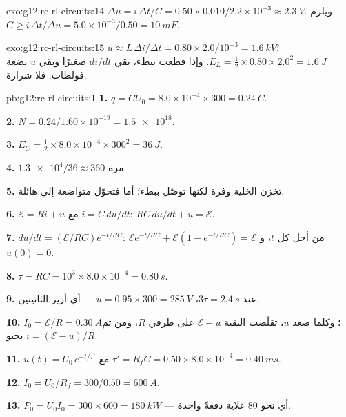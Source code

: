 \begin{solution}{exo:g12:rc-rl-circuits:14}
$\Delta u = i\,\Delta t/C = 0.50 \times 0.010/2.2\times10^{-3} \approx
\qty{2.3}{V}$. ويلزم $C \geq i\,\Delta t/\Delta u =
5.0\times10^{-3}/0.50 = \qty{10}{mF}$.
\end{solution}

\begin{solution}{exo:g12:rc-rl-circuits:15}
$u \approx L\,\Delta i/\Delta t = 0.80 \times 2.0/10^{-3} =
\qty{1.6}{kV}$؛ $E_L = \tfrac12 \times 0.80 \times 2.0^2 =
\qty{1.6}{J}$. وإذا قطعت ببطء، بقي $di/dt$ صغيرًا وبقي $u$ بضعة فولطات:
فلا شرارة.
\end{solution}

\begin{solution}{pb:g12:rc-rl-circuits:1}
\textbf{1.} $q = CU_0 = 8.0\times10^{-4} \times 300 = \qty{0.24}{C}$.

\textbf{2.} $N = 0.24/1.60\times10^{-19} = \num{1.5e18}$.

\textbf{3.} $E_C = \tfrac12 \times 8.0\times10^{-4} \times 300^2 =
\qty{36}{J}$.

\textbf{4.} $\num{1.3e4}/36 \approx 360$ مرة.

\textbf{5.} تخزن الخلية وفرة لكنها توصّل ببطء؛ أما 
فتحوّل  متواضعة إلى \emph{} هائلة.

\textbf{6.} $\mathcal{E} = Ri + u$ مع $i = C\,du/dt$:
$RC\,du/dt + u = \mathcal{E}$.

\textbf{7.} $du/dt = (\mathcal{E}/RC)e^{-t/RC}$:
$\mathcal{E}e^{-t/RC} + \mathcal{E}(1 - e^{-t/RC}) = \mathcal{E}$
من أجل كل $t$، و$u(0) = 0$.

\textbf{8.} $\tau = RC = 10^3 \times 8.0\times10^{-4} = \qty{0.80}{s}$.

\textbf{9.} عند $3\tau = \qty{2.4}{s}$، $u = 0.95 \times 300 =
\qty{285}{V}$ --- أي أزيز الثانيتين.

\textbf{10.} $I_0 = \mathcal{E}/R = \qty{0.30}{A}$؛ وكلما صعد $u$، تقلّصت
البقية $\mathcal{E} - u$ على طرفي $R$، ومن ثم يخبو
$i = (\mathcal{E}-u)/R$.

\textbf{11.} $u(t) = U_0\,e^{-t/\tau'}$ مع $\tau' = R_f C =
0.50 \times 8.0\times10^{-4} = \qty{0.40}{ms}$.

\textbf{12.} $I_0 = U_0/R_f = 300/0.50 = \qty{600}{A}$.

\textbf{13.} $P_0 = U_0 I_0 = 300 \times 600 = \qty{180}{kW}$ --- أي نحو
$80$ غلاية دفعةً واحدة.


\end{solution}
